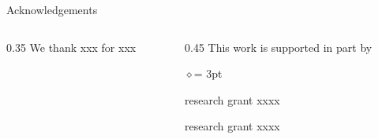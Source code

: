 
\begin{frame}{Acknowledgements}

  \begin{columns}
    \begin{column}{0.35\textwidth}
      We thank xxx for xxx 
    \end{column}
    \hspace*{2em}
    \begin{column}{0.45\textwidth}
      This work is supported in part by
      \begin{list}{$\diamond$}{\itemsep = 3pt \leftmargin=10pt}
        \item research grant xxxx
        \item research grant xxxx 
      \end{list}
    \end{column}
  \end{columns}

\end{frame}
